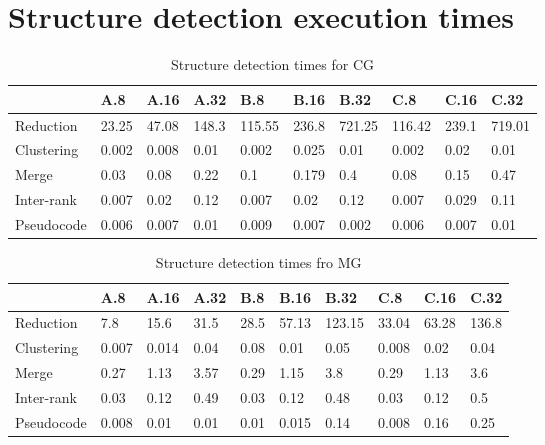 \section{Structure detection execution times}\label{s:strdect_exec_times}

\begin{table}[h]
\centering
\caption{Structure detection times for CG}
\label{tb:cg_strdec_times}
\begin{tabular}{@{}llllllllll@{}}
\toprule
           & A.8   & A.16  & A.32  & B.8    & B.16  & B.32   & C.8    & C.16  & C.32   \\ \midrule
Reduction  & 23.25 & 47.08 & 148.3 & 115.55 & 236.8 & 721.25 & 116.42 & 239.1 & 719.01 \\
Clustering & 0.002 & 0.008 & 0.01  & 0.002  & 0.025 & 0.01   & 0.002  & 0.02  & 0.01   \\
Merge      & 0.03  & 0.08  & 0.22  & 0.1    & 0.179 & 0.4    & 0.08   & 0.15  & 0.47   \\
Inter-rank & 0.007 & 0.02  & 0.12  & 0.007  & 0.02  & 0.12   & 0.007  & 0.029 & 0.11   \\
Pseudocode & 0.006 & 0.007 & 0.01  & 0.009  & 0.007 & 0.002  & 0.006  & 0.007 & 0.01   \\ \bottomrule
\end{tabular}
\end{table}

\begin{table}[h]
\centering
\caption{Structure detection times fro MG}
\label{tb:mg_strdec_times}
\begin{tabular}{@{}llllllllll@{}}
\toprule
           & A.8   & A.16  & A.32 & B.8  & B.16  & B.32   & C.8   & C.16  & C.32  \\ \midrule
Reduction  & 7.8   & 15.6  & 31.5 & 28.5 & 57.13 & 123.15 & 33.04 & 63.28 & 136.8 \\
Clustering & 0.007 & 0.014 & 0.04 & 0.08 & 0.01  & 0.05   & 0.008 & 0.02  & 0.04  \\
Merge      & 0.27  & 1.13  & 3.57 & 0.29 & 1.15  & 3.8    & 0.29  & 1.13  & 3.6   \\
Inter-rank & 0.03  & 0.12  & 0.49 & 0.03 & 0.12  & 0.48   & 0.03  & 0.12  & 0.5   \\
Pseudocode & 0.008 & 0.01  & 0.01 & 0.01 & 0.015 & 0.14   & 0.008 & 0.16  & 0.25  \\ \bottomrule
\end{tabular}
\end{table}
